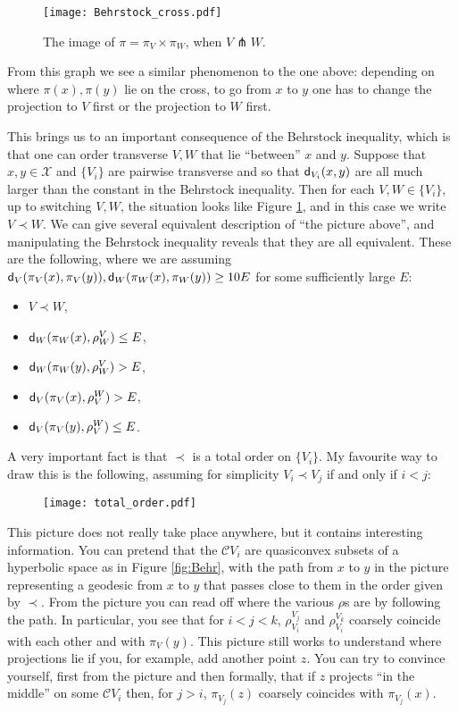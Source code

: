 \documentclass[11pt,oneside]{amsart}
\theoremstyle{definition}
\newcommand{\dist}{\textup{\textsf{d}}}
\newcommand{\cuco}[1]{{\mathcal #1}}
\newcommand{\fontact}{{\mathcal C}}
\newcommand{\transverse}{\pitchfork}
\begin{document}
  \begin{figure}[h]
  \texttt{[image: Behrstock\_cross.pdf]}
  \caption{The image of $\pi=\pi_V\times\pi_W$, when $V\transverse W$.}\label{fig:cross}
 \end{figure}
 
 From this graph we see a similar phenomenon to the one above: depending on where $\pi(x),\pi(y)$ lie on the cross, to go from $x$ to $y$ one has to change the projection to $V$ first or the projection to $W$ first.
 
 This brings us to an important consequence of the Behrstock inequality, which is that one can order transverse $V,W$ that lie ``between'' $x$ and $y$. Suppose that $x,y\in \cuco X$ and $\{V_i\}$ are pairwise transverse and so that $\dist_{V_i}(x,y)$ are all much larger than the constant in the Behrstock inequality. Then for each $V,W\in\{V_i\}$, up to switching $V,W$, the situation looks like Figure \ref{fig:cross}, and in this case we write $V\prec W$. We can give several equivalent description of ``the picture above'', and manipulating the Behrstock inequality reveals that they are all equivalent. These are the following, where we are assuming $\dist_V(\pi_V(x),\pi_V(y)),\dist_W(\pi_W(x),\pi_W(y))\geq 10E$ for some sufficiently large $E$:
 \begin{itemize}
  \item $V\prec W$,
  \item $\dist_W(\pi_W(x),\rho^V_W)\leq E$,
  \item $\dist_W(\pi_W(y),\rho^V_W)> E$,
  \item $\dist_V(\pi_V(x),\rho^W_V)> E$,
  \item $\dist_V(\pi_V(y),\rho^W_V)\leq E$.
 \end{itemize}
A very important fact is that $\prec$ is a total order on $\{V_i\}$. My favourite way to draw this is the following, assuming for simplicity $V_i\prec V_j$ if and only if $i<j$:

  \begin{figure}[h]
  \texttt{[image: total\_order.pdf]}
 \end{figure}
 

This picture does not really take place anywhere, but it contains interesting information. You can pretend that the $\fontact{V_i}$ are quasiconvex subsets of a hyperbolic space as in Figure \ref{fig:Behr}, with the path from $x$ to $y$ in the picture representing a geodesic from $x$ to $y$ that passes close to them in the order given by $\prec$. From the picture you can read off where the various $\rho$s are by following the path. In particular, you see that for $i<j<k$, $\rho^{V_j}_{V_i}$ and $\rho^{V_k}_{V_i}$ coarsely coincide with each other and with $\pi_V(y)$. This picture still works to understand where projections lie if you, for example, add another point $z$. You can try to convince yourself, first from the picture and then formally, that if $z$ projects ``in the middle'' on some $\fontact V_i$ then, for $j>i$, $\pi_{V_j}(z)$ coarsely coincides with $\pi_{V_j}(x)$.
\end{document}

